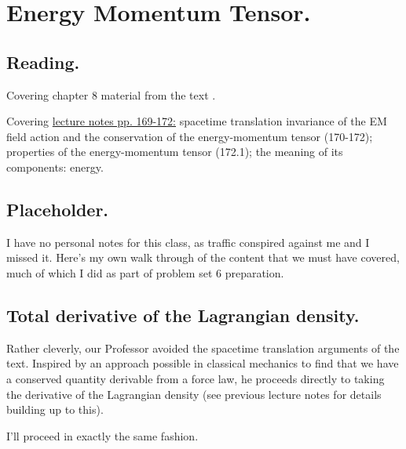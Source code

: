 
%

\chapter{Energy Momentum Tensor.}
\label{chap:relativisticElectrodynamicsL22}
{}
\date{Mar 23, 2011}

\beginArtNoToc

\section{Reading.}

Covering chapter 8 material from the text \cite{landau1980classical}.

Covering \href{http://www.physics.utoronto.ca/~poppitz/epoppitz/PHY450_files/RelEMpp166-180.pdf}{lecture notes pp. 169-172:} spacetime translation invariance of the EM field action and the conservation of the energy-momentum tensor (170-172); properties of the energy-momentum tensor (172.1); the meaning of its components: energy.

\section{Placeholder.}

I have no personal notes for this class, as traffic conspired against me and I missed it.  Here's my own walk through of the content that we must have covered, much of which I did as part of problem set 6 preparation.

\section{Total derivative of the Lagrangian density.}

Rather cleverly, our Professor avoided the spacetime translation arguments of the text.  Inspired by an approach possible in classical mechanics to find that we have a conserved quantity derivable from a force law, he proceeds directly to taking the derivative of the Lagrangian density (see previous lecture notes for details building up to this).

I'll proceed in exactly the same fashion.

